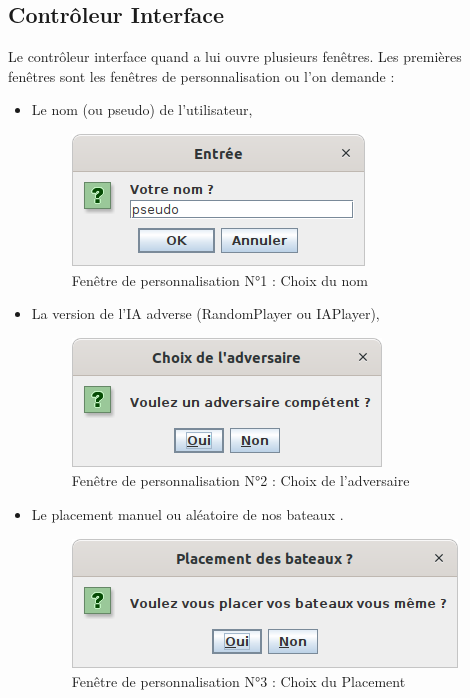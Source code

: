 \subsection{Contrôleur Interface}
\par Le contrôleur interface quand a lui ouvre plusieurs fenêtres. Les premières fenêtres sont les fenêtres de personnalisation ou l'on demande : \begin{itemize}
    \item Le nom (ou pseudo) de l'utilisateur,
        \begin{figure}[htp]
        \centering
        \includegraphics[scale=0.5]{images/interface/ChoixNom.png}
        \caption{\label{fig: ChoixNomI}Fenêtre de personnalisation N°1 : Choix du nom}
        \end{figure}
    \item La version de l'IA adverse (RandomPlayer ou IAPlayer),
        \begin{figure}[htp]
        \centering
        \includegraphics[scale=0.5]{images/interface/ChoixAdversaire.png}
        \caption{\label{fig: ChoixAdversaireI}Fenêtre de personnalisation N°2 : Choix de l'adversaire}
        \end{figure}
    \item Le placement manuel ou aléatoire de nos bateaux .\\
    \begin{figure}[htp]
    \centering
        \includegraphics[scale=0.5]{images/interface/ChoixPlacement.png}
        \caption{\label{fig: ChoixPlacementI}Fenêtre de personnalisation N°3 : Choix du Placement}
    \end{figure}
\end{itemize}
    
